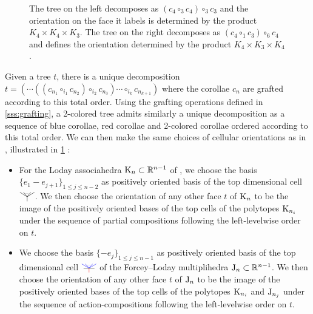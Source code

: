 \documentclass[twoside, 12pt]{amsart}
\theoremstyle{remark}
\begin{document}
\begin{figure}[h!]

\centering

\begin{subfigure}{0.4\textwidth}
\centering
\exampleleftlevelwiseone
\end{subfigure}
\begin{subfigure}{0.4\textwidth}
\centering
\exampleleftlevelwisetwo
\end{subfigure}

\caption{The tree on the left decomposes as $(c_4\circ_3 c_4)\circ_3 c_3$ and the orientation on the face it labels is determined by the product $K_4 \times K_4 \times K_3$. 
The tree on the right decomposes as $ (c_4\circ_1 c_3)\circ_6 c_4$ and defines the orientation determined by the product $K_4 \times K_3 \times K_4$.} 
\label{fig:left-levelwise-order}
\end{figure}


Given a tree $t$, there is a unique decomposition $t=(\cdots ((c_{n_1} \circ_{i_1} c_{n_2})\circ_{i_2}c_{n_3})\cdots \circ_{i_k} c_{n_{k+1}})$ where the corollae $c_n$ are grafted according to this total order. Using the grafting operations defined in \cref{sss:grafting}, a 2-colored tree admits similarly a unique decomposition as a sequence of blue corollae, red corollae and 2-colored corollae ordered according to this total order. 
We can then make the same choices of cellular orientations as in \cite[I, Section 1.4]{Mazuir21}, illustrated in \cref{fig:left-levelwise-order} :
\begin{itemize}
  \item For the Loday associahedra $\mathrm{K}_n \subset \mathbb{R}^{n-1}$ of \cite{MTTV19}, we choose the basis $\{e_1 - e_{j+1}\}_{1\leq j \leq n-2}$ as positively oriented basis of the top dimensional cell $\arbreop{0.15}$. We then choose the orientation of any other face $t$ of $\mathrm{K}_n$ to be the image of the positively oriented bases of the top cells of the polytopes $\mathrm{K}_{n_i}$ under the sequence of partial compositions following the left-levelwise order on $t$. 
  \item We choose the basis $\{- e_j\}_{1\leq j \leq n-1}$ as positively oriented basis of the top dimensional cell $\arbreopmorph{0.15}$ of the Forcey--Loday multiplihedra $\mathrm{J}_n \subset \mathbb{R}^{n-1}$. We then choose the orientation of any other face $t$ of $\mathrm{J}_n$ to be the image of the positively oriented bases of the top cells of the polytopes $\mathrm{K}_{n_i}$ and $\mathrm{J}_{n_j}$ under the sequence of action-compositions following the left-levelwise order on $t$.
\end{itemize}
\end{document}
